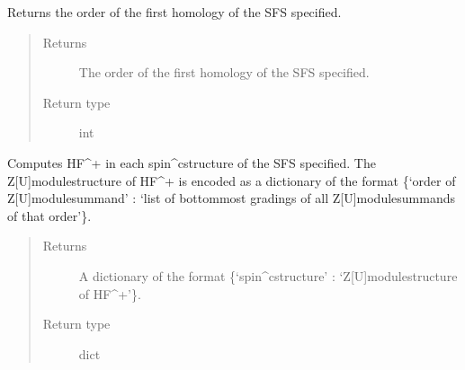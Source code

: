 \documentclass[letterpaper,10pt,english]{sphinxmanual}
\begin{document}
\begin{fulllineitems}
\begin{fulllineitems}
\end{fulllineitems}


\begin{fulllineitems}
\label{\detokenize{soapy:soapy.SFS.order_of_first_homology}}
\sphinxAtStartPar
Returns the order of the first homology of the SFS specified.
\begin{quote}\begin{description}
\item[{Returns}] \leavevmode
\sphinxAtStartPar
The order of the first homology of the SFS specified.

\item[{Return type}] \leavevmode
\sphinxAtStartPar
int

\end{description}\end{quote}

\end{fulllineitems}


\begin{fulllineitems}
\label{\detokenize{soapy:soapy.SFS.spinc_to_HF}}
\sphinxAtStartPar
Computes HF\textasciicircum{}+ in each spin\textasciicircum{}c\sphinxhyphen{}structure of the SFS specified. The Z{[}U{]}\sphinxhyphen{}module\sphinxhyphen{}structure of HF\textasciicircum{}+ is encoded as a dictionary of the format \{‘order of Z{[}U{]}\sphinxhyphen{}module\sphinxhyphen{}summand’ : ‘list of bottommost gradings of all Z{[}U{]}\sphinxhyphen{}module\sphinxhyphen{}summands of that order’\}.
\begin{quote}\begin{description}
\item[{Returns}] \leavevmode
\sphinxAtStartPar
A dictionary of the format \{‘spin\textasciicircum{}c\sphinxhyphen{}structure’ : ‘Z{[}U{]}\sphinxhyphen{}module\sphinxhyphen{}structure of HF\textasciicircum{}+’\}.

\item[{Return type}] \leavevmode
\sphinxAtStartPar
dict

\end{description}\end{quote}


\end{fulllineitems}
\end{fulllineitems}
\end{document}
